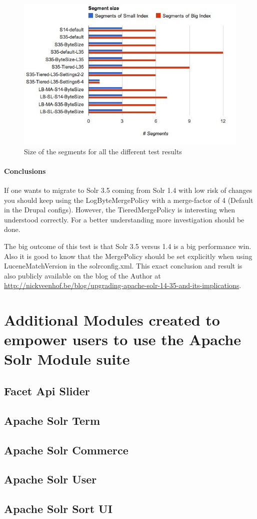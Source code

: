 \begin{figure}
     \includegraphics[width=\textwidth]{images/implementation/segments_0.jpg}
     \caption{Size of the segments for all the different test results}
\end{figure}

\paragraph{Conclusions}
If one wants to migrate to Solr 3.5 coming from Solr 1.4 with low risk of changes you should keep using the LogByteMergePolicy with a merge-factor of 4 (Default in the Drupal configs). 
However, the TieredMergePolicy is interesting when understood correctly. For a better understanding more investigation should be done. 

The big outcome of this test is that Solr 3.5 versus 1.4 is a big performance win. Also it is good to know that the MergePolicy should be set explicitly when using LuceneMatchVersion in the solrconfig.xml. This exact conclusion and result is also publicly available on the blog of the Author at \url{http://nickveenhof.be/blog/upgrading-apache-solr-14-35-and-its-implications}.

\section{Additional Modules created to empower users to use the Apache Solr Module suite}
\subsection{Facet Api Slider}
\subsection{Apache Solr Term}
\subsection{Apache Solr Commerce}
\subsection{Apache Solr User}
\subsection{Apache Solr Sort UI}
